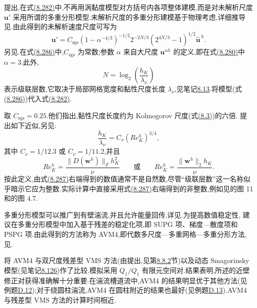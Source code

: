 \begin{note}
\label{note:vms-avm4-multifractal-model}
\textcite{RasthoferGravemeier2013} 提出,在式\hyperref[eq:vms-avm-unresolved-bracket]{(8.282)}中,不再用涡黏度模型对方括号内各项整体建模,而是对未解析尺度 $\bm u'$ 采用所谓的多重分形模型.未解析尺度的多重分形建模基于物理考虑,详细推导见\textcite{BurtonDahm2005a,BurtonDahm2005b}.由此得到的未解析速度尺度可写为
\begin{equation}\label{eq:vms-avm4-unresolved-scale-model}
 \bm u'=C_{\mathrm{sgs}}
   (1-\alpha^{-4/3})^{-1/2}2^{-2N/3}
   (2^{4N/3}-1)^{1/2}\widehat{\bm u}^{\,h}.
\end{equation}
另见\textcite{RasthoferGravemeier2013}.在式\hyperref[eq:vms-avm4-unresolved-scale-model]{(8.286)}中,$C_{\mathrm{sgs}}$ 为常数;参数 $\alpha$ 来自大尺度 $\bm u^{\alpha h}$ 的定义,即在式\hyperref[eq:vms-avm-scale-decomposition]{(8.280)}中 $\alpha=3$.此外,
\begin{equation}\label{eq:vms-avm4-cascade-number}
 N=\log_2\left(\frac{h_K}{\lambda_\nu}\right)
\end{equation}
表示级联层数,它取决于局部网格宽度和黏性尺度长度 $\lambda_\nu$,见笔记\hyperref[note:kolmogorov-scale-size]{8.13}.将模型(式\hyperref[eq:vms-avm4-unresolved-scale-model]{(8.286)})代入式\hyperref[eq:vms-avm-unresolved-bracket]{(8.282)}.

\textcite{RasthoferGravemeier2013} 取 $C_{\mathrm{sgs}}=0.25$.他们指出,黏性尺度长度约为 Kolmogorov 尺度(式\hyperref[eq:kolmogorov-scales]{(8.3)})的六倍.\textcite{RasthoferGravemeier2013,Rasthofer2015} 提出如下近似,另见\textcite[第 4.2.5 节]{Rasthofer2015}:
\[
 \frac{h_K}{\lambda_\nu}=C_\nu(Re_K^h)^{3/4},
\]
其中 $C_\nu=1/12.3$ 或 $C_\nu=1/11.2$,并且
\[
 Re_K^h=\frac{\|D(\bm w^h)\|_F h_K^2}{\nu}
 \qquad\text{或}\qquad
 Re_K^h=\frac{\|\bm w^h\|_2h_K}{\nu}.
\]
按此定义,由式\hyperref[eq:vms-avm4-cascade-number]{(8.287)}右端得到的数值通常不是自然数,尽管“级联层数”这一名称似乎暗示它应为整数.实际计算中直接采用式\hyperref[eq:vms-avm4-cascade-number]{(8.287)}右端得到的非整数,例如见\textcite{RasthoferGravemeier2013}的图 11 和\textcite{Rasthofer2015}的图 4.7.

多重分形模型可以推广到有壁湍流,并且允许能量回传,详见\textcite{RasthoferGravemeier2013,Rasthofer2015}.为提高数值稳定性,\textcite{RasthoferGravemeier2013,Rasthofer2015} 建议在多重分形模型中加入基于残差的稳定化项,即 SUPG 项、梯度—散度项和 PSPG 项.由此得到的方法称为 AVM4,即代数多尺度—多重网格—多重分形方法,见\textcite{Rasthofer2015}.

\textcite{Rasthofer2015} 将 AVM4 与双尺度残差型 VMS 方法(由\textcite{Bazilevs2007}提出,见第\hyperref[subsec:vms-residual-based-method]{8.8.2}节)以及动态 Smagorinsky 模型(见笔记\hyperref[note:dynamic-smagorinsky-model]{8.126})作了比较.模拟采用 $Q_1/Q_1$ 有限元空间对.结果表明,\textcite{Rasthofer2015}所述的近壁修正对获得准确解十分重要.在湍流槽道流中,AVM4 的结果明显优于其他方法(见例题\hyperref[ex:appendix-d-12]{D.12});对于绕圆柱湍流,AVM4 在圆柱附近的结果也最好(见例题\hyperref[ex:appendix-d-13]{D.13}).AVM4 与残差型 VMS 方法的计算时间相近.
\end{note}

